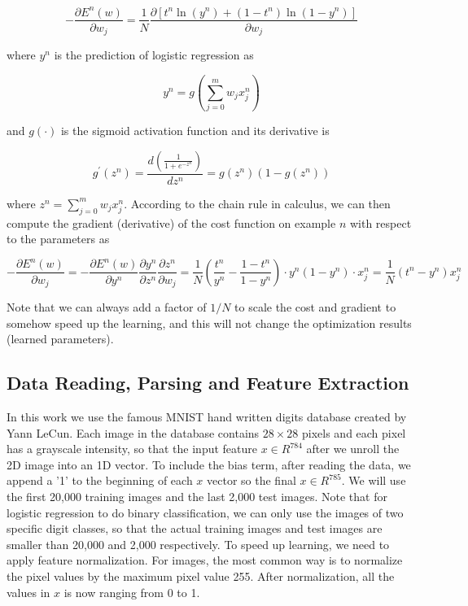 \documentclass{article} %
\begin{document}
\begin{equation}
	-\frac{\partial E^{n}(w)}{\partial w_{j}} = \frac{1}{N}\frac{\partial [t^{n}\ln(y^{n})+(1-t^{n})\ln(1-y^{n})]}{\partial w_{j}} 
\end{equation}

where $y^{n}$ is the prediction of logistic regression as

\begin{equation}
	y^{n} = g(\sum_{j=0}^{m}w_{j}x_{j}^{n})
\end{equation}

and $g(\cdot)$ is the sigmoid activation function and its derivative is

\begin{equation}
	g^{\prime}(z^{n}) = \frac{d(\frac{1}{1+e^{-z^{n}}})}{dz^{n}} = g(z^{n})(1-g(z^{n}))
\end{equation}

where $z ^{n}= \sum_{j=0}^{m}w_{j}x_{j}^{n}$. According to the chain rule in calculus, we can then compute the gradient (derivative) of the cost function on example $n$ with respect to the parameters as

\begin{equation}
	-\frac{\partial E^{n}(w)}{\partial w_{j}} = -\frac{\partial E^{n}(w)}{\partial y^{n}}\frac{\partial y^{n}}{\partial z^{n}}\frac{\partial z^{n}}{\partial w_{j}} = \frac{1}{N}(\frac{t^{n}}{y^{n}}-\frac{1-t^{n}}{1-y^{n}})\cdot y^{n}(1-y^{n})\cdot x_{j}^{n} = \frac{1}{N}(t^{n}-y^{n})x_{j}^{n}
\end{equation}

Note that we can always add a factor of $1/N$ to scale the cost and gradient to somehow speed up the learning, and this will not change the optimization results (learned parameters).

\subsection{Data Reading, Parsing and Feature Extraction} 
In this work we use the famous MNIST hand written digits database created by Yann LeCun. Each image in the database contains $28 \times 28$ pixels and each pixel has a grayscale intensity, so that the input feature $x \in R^{784}$ after we unroll the 2D image into an 1D vector. To include the bias term, after reading the data, we append a '1' to the beginning of each $x$ vector so the final $x \in R^{785}$. We will use the first 20,000 training images and the last 2,000 test images. Note that for logistic regression to do binary classification, we can only use the images of two specific digit classes, so that the actual training images and test images are smaller than 20,000 and 2,000 respectively. To speed up learning, we need to apply feature normalization. For images, the most common way is to normalize the pixel values by the maximum pixel value 255. After normalization, all the values in $x$ is now ranging from 0 to 1.
\end{document}

